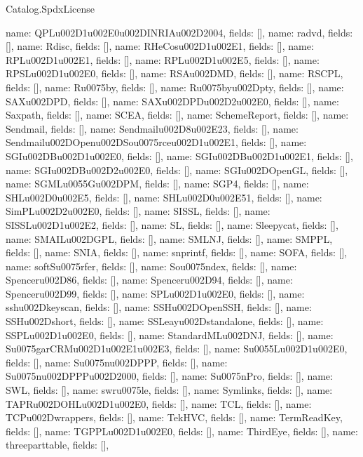 \begin{lexlean}{Catalog.SpdxLicense}
\begin{semanticmodule}
{    {name: QPLu002D1u002E0u002DINRIAu002D2004, fields: []},
    {name: radvd, fields: []},
    {name: Rdisc, fields: []},
    {name: RHeCosu002D1u002E1, fields: []},
    {name: RPLu002D1u002E1, fields: []},
    {name: RPLu002D1u002E5, fields: []},
    {name: RPSLu002D1u002E0, fields: []},
    {name: RSAu002DMD, fields: []},
    {name: RSCPL, fields: []},
    {name: Ru0075by, fields: []},
    {name: Ru0075byu002Dpty, fields: []},
    {name: SAXu002DPD, fields: []},
    {name: SAXu002DPDu002D2u002E0, fields: []},
    {name: Saxpath, fields: []},
    {name: SCEA, fields: []},
    {name: SchemeReport, fields: []},
    {name: Sendmail, fields: []},
    {name: Sendmailu002D8u002E23, fields: []},
    {name: Sendmailu002DOpenu002DSou0075rceu002D1u002E1, fields: []},
    {name: SGIu002DBu002D1u002E0, fields: []},
    {name: SGIu002DBu002D1u002E1, fields: []},
    {name: SGIu002DBu002D2u002E0, fields: []},
    {name: SGIu002DOpenGL, fields: []},
    {name: SGMLu0055Gu002DPM, fields: []},
    {name: SGP4, fields: []},
    {name: SHLu002D0u002E5, fields: []},
    {name: SHLu002D0u002E51, fields: []},
    {name: SimPLu002D2u002E0, fields: []},
    {name: SISSL, fields: []},
    {name: SISSLu002D1u002E2, fields: []},
    {name: SL, fields: []},
    {name: Sleepycat, fields: []},
    {name: SMAILu002DGPL, fields: []},
    {name: SMLNJ, fields: []},
    {name: SMPPL, fields: []},
    {name: SNIA, fields: []},
    {name: snprintf, fields: []},
    {name: SOFA, fields: []},
    {name: softSu0075rfer, fields: []},
    {name: Sou0075ndex, fields: []},
    {name: Spenceru002D86, fields: []},
    {name: Spenceru002D94, fields: []},
    {name: Spenceru002D99, fields: []},
    {name: SPLu002D1u002E0, fields: []},
    {name: sshu002Dkeyscan, fields: []},
    {name: SSHu002DOpenSSH, fields: []},
    {name: SSHu002Dshort, fields: []},
    {name: SSLeayu002Dstandalone, fields: []},
    {name: SSPLu002D1u002E0, fields: []},
    {name: StandardMLu002DNJ, fields: []},
    {name: Su0075garCRMu002D1u002E1u002E3, fields: []},
    {name: Su0055Lu002D1u002E0, fields: []},
    {name: Su0075nu002DPPP, fields: []},
    {name: Su0075nu002DPPPu002D2000, fields: []},
    {name: Su0075nPro, fields: []},
    {name: SWL, fields: []},
    {name: swru0075le, fields: []},
    {name: Symlinks, fields: []},
    {name: TAPRu002DOHLu002D1u002E0, fields: []},
    {name: TCL, fields: []},
    {name: TCPu002Dwrappers, fields: []},
    {name: TekHVC, fields: []},
    {name: TermReadKey, fields: []},
    {name: TGPPLu002D1u002E0, fields: []},
    {name: ThirdEye, fields: []},
    {name: threeparttable, fields: []},
}
\end{semanticmodule}
\end{lexlean}
